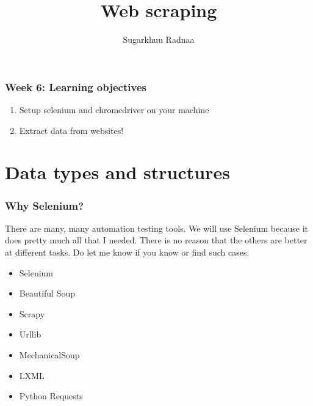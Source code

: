 \documentclass{beamer}
\title[Introduction to Python]{Web scraping}
\author{Sugarkhuu Radnaa}
\institute[]
{
Py4Econ in Ulaanbaatar \\ 
\medskip
\textit{py4econ@gmail.com} 
}
\date{}  %
\begin{document}
\begin{frame}
\titlepage %
\end{frame}

\begin{frame}
    \frametitle{Week 6: Learning objectives}
    \begin{enumerate}
        \item Setup selenium and chromedriver on your machine
        \item Extract data from websites!
    \end{enumerate}
\end{frame}

\section{Data types and structures} 

\begin{frame}
    \frametitle{Why Selenium?}

    There are many, many automation testing tools. We will use Selenium because it does pretty much all that I needed. There is no reason
    that the others are better at different tasks. Do let me know if you know or find such cases. 

    \begin{itemize}
        \item Selenium
        \item Beautiful Soup
        \item Scrapy
        \item Urllib
        \item MechanicalSoup
        \item LXML
        \item Python Requests
    \end{itemize}
\end{frame}
\end{document}
